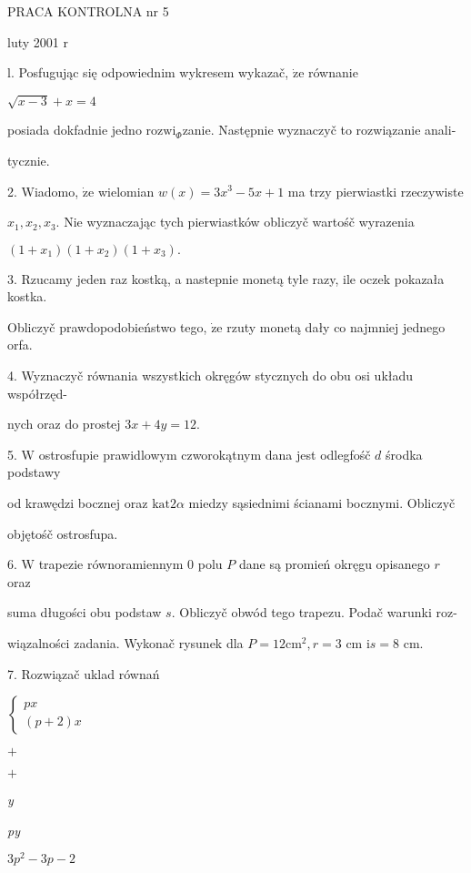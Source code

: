 \documentclass[a4paper,12pt]{article}
\begin{document}
PRACA KONTROLNA nr 5

luty 2001 $\mathrm{r}$

l. Posfugując się odpowiednim wykresem wykazač, $\dot{\mathrm{z}}\mathrm{e}$ równanie

$\sqrt{x-3}+x=4$

posiada dokfadnie jedno $\mathrm{r}\mathrm{o}\mathrm{z}\mathrm{w}\mathrm{i}_{\Phi}$zanie. Następnie wyznaczyč to rozwiązanie anali-

tycznie.

2. Wiadomo, $\dot{\mathrm{z}}\mathrm{e}$ wielomian $w(x) = 3x^{3}-5x+1$ ma trzy pierwiastki rzeczywiste

$x_{1}, x_{2}, x_{3}$. Nie wyznaczając tych pierwiastków obliczyč wartośč wyrazenia

$(1+x_{1})(1+x_{2})(1+x_{3}).$

3. Rzucamy jeden raz kostką, a nastepnie monetą tyle razy, ile oczek pokazała kostka.

Obliczyč prawdopodobieństwo tego, $\dot{\mathrm{z}}\mathrm{e}$ rzuty monetą dały co najmniej jednego orfa.

4. Wyznaczyč równania wszystkich okręgów stycznych do obu osi układu współrzęd-

nych oraz do prostej $3x+4y=12.$

5. $\mathrm{W}$ ostrosfupie prawidlowym czworokątnym dana jest odlegfośč $d$ środka podstawy

od krawędzi bocznej oraz $\mathrm{k}\mathrm{a}\mathrm{t}  2\alpha$ miedzy sąsiednimi ścianami bocznymi. Obliczyč

objętośč ostrosfupa.

6. $\mathrm{W}$ trapezie równoramiennym $0$ polu $P$ dane są promień okręgu opisanego $r$ oraz

suma długości obu podstaw $s$. Obliczyč obwód tego trapezu. Podač warunki roz-

wiązalności zadania. Wykonač rysunek dla $P=12\mathrm{c}\mathrm{m}^{2}, r=3$ cm $\mathrm{i}s=8$ cm.

7. Rozwiązač uklad równań

$\left\{\begin{array}{l}
px\\
(p+2)x
\end{array}\right.$

$+$

$+$

{\it y}

{\it py}

$3p^{2}-3p-2$
\end{document}

